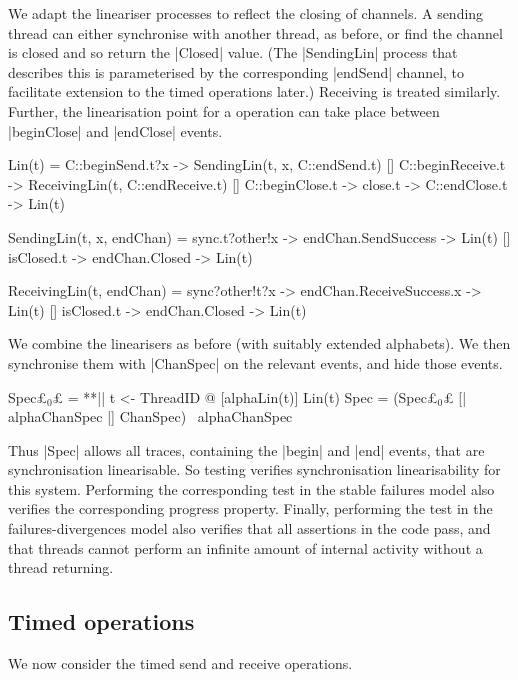 We adapt the lineariser processes to reflect the closing of channels.  A
sending thread can either synchronise with another thread, as before, or find
the channel is closed and so return the |Closed| value.  (The |SendingLin|
process that describes this is parameterised by the corresponding |endSend|
channel, to facilitate extension to the timed operations later.)  Receiving is
treated similarly.  Further, the linearisation point for a 
operation can take place between |beginClose| and |endClose| events.
%
\begin{cspm}
Lin(t) = 
  C::beginSend.t?x -> SendingLin(t, x, C::endSend.t)
  [] C::beginReceive.t -> ReceivingLin(t, C::endReceive.t)
  [] C::beginClose.t -> close.t -> C::endClose.t -> Lin(t)

SendingLin(t, x, endChan) = 
  sync.t?other!x -> endChan.SendSuccess -> Lin(t)
  [] isClosed.t -> endChan.Closed -> Lin(t)

ReceivingLin(t, endChan) =  
  sync?other!t?x -> endChan.ReceiveSuccess.x -> Lin(t)
  [] isClosed.t -> endChan.Closed -> Lin(t)
\end{cspm}

We combine the linearisers as before (with suitably extended alphabets).  We
then synchronise them with |ChanSpec| on the relevant events, and hide those
events.
%
\begin{cspm}
Spec£$_0$£ = **|| t <- ThreadID @ [alphaLin(t)] Lin(t)
Spec = (Spec£$_0$£ [| alphaChanSpec |] ChanSpec) \ alphaChanSpec
\end{cspm}
%
Thus |Spec| allows all traces, containing the |begin| and |end| events, that
are synchronisation linearisable.  So testing \CSPM{Spec [T= System}
verifies synchronisation linearisability for this system.  Performing the
corresponding test in the stable failures model also verifies the
corresponding progress property.  Finally, performing the test in the
failures-divergences model also verifies that all assertions in the code pass,
and that threads cannot perform an infinite amount of internal activity
without a thread returning. 


\subsection{Timed operations}

\inlineScala

We now consider the timed send and receive operations.  

